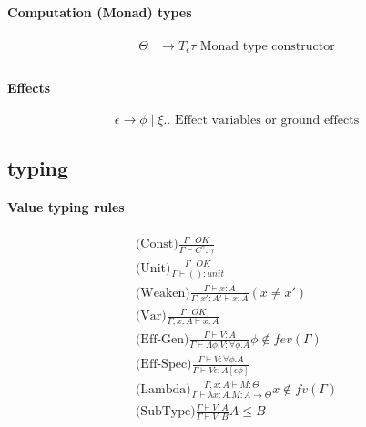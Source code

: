 \documentclass[twoside,a4paper,11pt]{article}
\newcommand{\s}{\mbox{ }}
\newcommand{\subtype}{\leq}
\newcommand{\typeJudgement}[2]{\Gamma\vdash #1 \colon #2}
\newcommand{\modVarTypeJudgement}[3]{\Gamma, #1 \vdash #2 \colon #3}
\newcommand{\conditionalrule}[4]{\syntaxRule{#1}{#2}{#3} #4}
\newcommand{\syntaxRule}[3]{\displaystyle\mbox{#1}\frac{#2}{#3}}
\begin{document}
\paragraph{Computation (Monad) types}
\begin{equation}
\label{PDefifinition}
\begin{split}
\Theta & \rightarrow T _\epsilon \tau \mbox{ Monad type constructor}\\
\end{split}
\end{equation} 


\paragraph{Effects}

$$ \epsilon \rightarrow \phi \mid \xi .. \mbox{ Effect variables or ground effects}$$

\subsection{typing}

\paragraph{Value typing rules}
\[ \begin{array}{c}
\syntaxRule{(Const)}{\Gamma\s OK}{\typeJudgement{C^{\gamma}}{\gamma}} \\[3ex]

\syntaxRule{(Unit)}{\Gamma\s OK}{\typeJudgement{()}{unit}} \\[3ex]

\conditionalrule{(Weaken)}{\typeJudgement{x}{A}}{\modVarTypeJudgement{x' : A'}{x}{A}}{(x \neq x')} \\[3ex]

\syntaxRule{(Var)}{\Gamma\s OK}{\modVarTypeJudgement{x: A}{x}{A}} \\[3ex]

\conditionalrule{(Eff-Gen)}{\typeJudgement{V}{A}}{\typeJudgement{\Lambda \phi. V}{\forall \phi. A}}{\phi \not\in fev(\Gamma)} \\[3ex]

\syntaxRule{(Eff-Spec)}{\typeJudgement{V}{\forall \phi. A}}{\typeJudgement{V \epsilon}{A {[\epsilon \phi] }}} \\[3ex]

\conditionalrule{(Lambda)}{\modVarTypeJudgement{x: A}{M}{\Theta}}{\typeJudgement{\lambda x : A. M}{A  \rightarrow \Theta}}{x \not\in fv(\Gamma)}
\\[3ex]
\conditionalrule{(SubType)}{\typeJudgement{V}{A}}{\typeJudgement{V}{B}}{A \subtype B}
\end{array} \]
\end{document}
